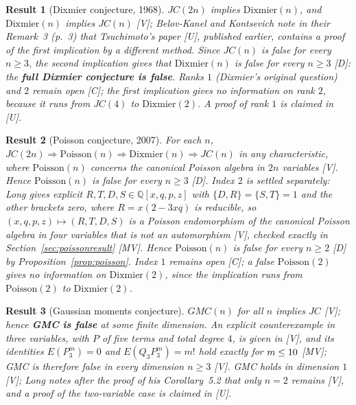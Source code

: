 \documentclass[11pt]{article}
\newtheorem{corollary}{Result}
\theoremstyle{remark}
\newcommand{\Q}{\mathbb{Q}}
\begin{document}
\begin{corollary}[Dixmier conjecture, 1968]
$JC(2n)$ implies $\mathrm{Dixmier}(n)$, and $\mathrm{Dixmier}(n)$ implies $JC(n)$ \cite[Theorem~1 and the remark on $DC_n\Rightarrow JC_n$, p.~2]{BKK2007} [V]; Belov-Kanel and Kontsevich note in their Remark~3 (p.~3) that Tsuchimoto's paper \cite{Tsuchimoto2005} [U], published earlier, contains a proof of the first implication by a different method. Since $JC(n)$ is false for every $n \ge 3$, the second implication gives that $\mathrm{Dixmier}(n)$ is false for every $n \ge 3$ [D]: the \textbf{full Dixmier conjecture is false}. Ranks $1$ (Dixmier's original question) and $2$ remain open [C]; the first implication gives no information on rank $2$, because it runs from $JC(4)$ to $\mathrm{Dixmier}(2)$. A proof of rank $1$ is claimed in \cite[abstract, p.~1]{Zheglov2024} [U].
\end{corollary}

\begin{corollary}[Poisson conjecture, 2007]\label{res:poisson}
For each $n$, $JC(2n) \Rightarrow \mathrm{Poisson}(n) \Rightarrow \mathrm{Dixmier}(n) \Rightarrow JC(n)$ in any characteristic, where $\mathrm{Poisson}(n)$ concerns the canonical Poisson algebra in $2n$ variables \cite[Theorem~7, p.~14]{AvdE2007} [V]. Hence $\mathrm{Poisson}(n)$ is false for every $n \ge 3$ [D]. Index $2$ is settled separately: Long gives explicit $R, T, D, S \in \Q[x,q,p,z]$ with $\{D,R\} = \{S,T\} = 1$ and the other brackets zero, where $R = x(2-3xq)$ is reducible, so $(x,q,p,z) \mapsto (R,T,D,S)$ is a Poisson endomorphism of the canonical Poisson algebra in four variables that is not an automorphism \cite[abstract, p.~1; Theorem~1.1, pp.~2--3; Lemma~3.1, p.~5]{LongPoisson2026} [V], checked exactly in Section~\ref{sec:poissonresult} [MV]. Hence $\mathrm{Poisson}(n)$ is false for every $n \ge 2$ [D] by Proposition~\ref{prop:poisson}. Index $1$ remains open [C]; a false $\mathrm{Poisson}(2)$ gives no information on $\mathrm{Dixmier}(2)$, since the implication runs from $\mathrm{Poisson}(2)$ to $\mathrm{Dixmier}(2)$.
\end{corollary}

\begin{corollary}[Gaussian moments conjecture]
$GMC(n)$ for all $n$ implies $JC$ \cite[Theorem~1.6, p.~2]{DEZ2017} [V]; hence \textbf{GMC is false} at some finite dimension. An explicit counterexample in three variables, with $P$ of five terms and total degree $4$, is given in \cite[abstract, p.~1; Theorem~5.1, p.~6]{Long2026} [V], and its identities $E(P_3^m)=0$ and $E(Q_3P_3^m)=m!$ hold exactly for $m\le10$ [MV]; GMC is therefore false in every dimension $n \ge 3$ [V]. GMC holds in dimension $1$ \cite[Proposition~4.2, p.~6]{DEZ2017} [V]; Long notes after the proof of his Corollary~5.2 that only $n=2$ remains \cite[p.~6]{Long2026} [V], and a proof of the two-variable case is claimed in \cite[abstract, p.~1]{Wilson2026} [U].
\end{corollary}
\end{document}
